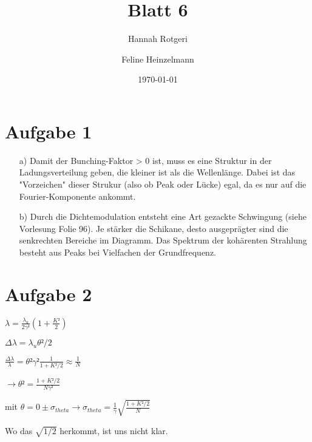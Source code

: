 \documentclass[11pt,a4paper]{article}
\title{Blatt 6}
\date{\today}
\author{Hannah Rotgeri \and Feline Heinzelmann}
\begin{document}
    \maketitle

    \section*{Aufgabe 1}
	\begin{itemize}
		\item[a)]
			Damit der Bunching-Faktor > 0 ist, muss es eine Struktur in der Ladungsverteilung geben, die kleiner ist als die Wellenlänge.
			Dabei ist das "Vorzeichen" dieser Strukur (also ob Peak oder Lücke) egal, da es nur auf die Fourier-Komponente ankommt.
		\item[b)]
			Durch die Dichtemodulation entsteht eine Art gezackte Schwingung (siehe Vorlesung Folie 96).
			Je stärker die Schikane, desto ausgeprägter sind die senkrechten Bereiche im Diagramm.
			Das Spektrum der kohärenten Strahlung besteht aus Peaks bei Vielfachen der Grundfrequenz.
	\end{itemize}


	
    \section*{Aufgabe 2}


		$\lambda = \frac{\lambda_u}{2\gamma²}(1+\frac{K²}{2})$

		$\Delta \lambda = \lambda_u \theta² /2$

		$\frac{\Delta \lambda}{\lambda} = \theta² \gamma² \frac{1}{1+K²/2} \approx \frac{1}{N}$

		$\to \theta² = \frac{1+K²/2}{N\gamma²}$

		mit $\theta = 0 \pm \sigma_{theta}  \to \sigma_{theta} = \frac{1}{\gamma} \sqrt{\frac{1+K²/2}{N}}$

		Wo das $\sqrt{1/2}$ herkommt, ist uns nicht klar.
\end{document}
